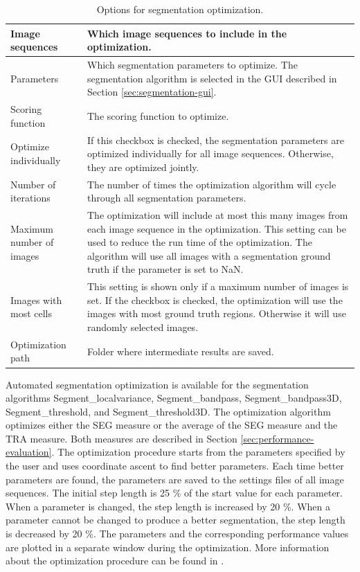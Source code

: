 \documentclass[a4paper, oneside, onecolumn, 11pt]{article}
\begin{document}
\begin{table}[!htb]
\caption{Options for segmentation optimization.}
\label{tab:segmentation-optimization}
\begin{tabularx}{\textwidth}{lX}
\hline
Image sequences & Which image sequences to include in the optimization.\\[5pt] \hline

Parameters & Which segmentation parameters to optimize. The segmentation algorithm is selected in the GUI described in Section \ref{sec:segmentation-gui}. \\[5pt] \hline

Scoring function & The scoring function to optimize. \\[5pt] \hline

Optimize individually & If this checkbox is checked, the segmentation parameters are optimized individually for all image sequences. Otherwise, they are optimized jointly. \\[5pt] \hline

Number of iterations & The number of times the optimization algorithm will cycle through all segmentation parameters. \\[5pt] \hline

Maximum number of images & The optimization will include at most this many images from each image sequence in the optimization. This setting can be used to reduce the run time of the optimization. The algorithm will use all images with a segmentation ground truth if the parameter is set to NaN. \\[5pt] \hline

Images with most cells & This setting is shown only if a maximum number of images is set. If the checkbox is checked, the optimization will use the images with most ground truth regions. Otherwise it will use randomly selected images. \\[5pt] \hline

Optimization path & Folder where intermediate results are saved. \\[5pt] \hline
\end{tabularx}
\end{table}

Automated segmentation optimization is available for the segmentation algorithms Segment\_localvariance, Segment\_bandpass, Segment\_bandpass3D, Segment\_threshold, and Segment\_threshold3D. The optimization algorithm optimizes either the SEG measure or the average of the SEG measure and the TRA measure. Both measures are described in Section \ref{sec:performance-evaluation}. The optimization procedure starts from the parameters specified by the user and uses coordinate ascent to find better parameters. Each time better parameters are found, the parameters are saved to the settings files of all image sequences. The initial step length is 25 \% of the start value for each parameter. When a parameter is changed, the step length is increased by 20 \%. When a parameter cannot be changed to produce a better segmentation, the step length is decreased by 20 \%. The parameters and the corresponding performance values are plotted in a separate window during the optimization. More information about the optimization procedure can be found in \cite{Magnusson16Thesis}.
\end{document}
